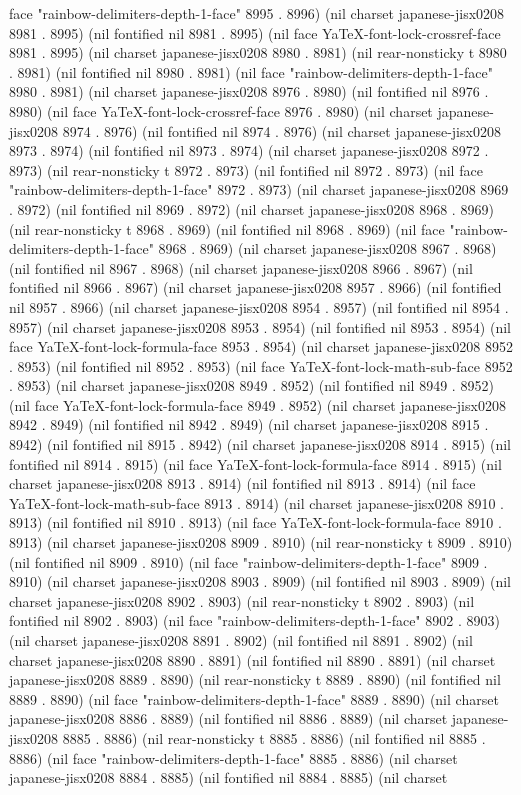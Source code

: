 face "rainbow-delimiters-depth-1-face" 8995 . 8996) (nil charset japanese-jisx0208 8981 . 8995) (nil fontified nil 8981 . 8995) (nil face YaTeX-font-lock-crossref-face 8981 . 8995) (nil charset japanese-jisx0208 8980 . 8981) (nil rear-nonsticky t 8980 . 8981) (nil fontified nil 8980 . 8981) (nil face "rainbow-delimiters-depth-1-face" 8980 . 8981) (nil charset japanese-jisx0208 8976 . 8980) (nil fontified nil 8976 . 8980) (nil face YaTeX-font-lock-crossref-face 8976 . 8980) (nil charset japanese-jisx0208 8974 . 8976) (nil fontified nil 8974 . 8976) (nil charset japanese-jisx0208 8973 . 8974) (nil fontified nil 8973 . 8974) (nil charset japanese-jisx0208 8972 . 8973) (nil rear-nonsticky t 8972 . 8973) (nil fontified nil 8972 . 8973) (nil face "rainbow-delimiters-depth-1-face" 8972 . 8973) (nil charset japanese-jisx0208 8969 . 8972) (nil fontified nil 8969 . 8972) (nil charset japanese-jisx0208 8968 . 8969) (nil rear-nonsticky t 8968 . 8969) (nil fontified nil 8968 . 8969) (nil face "rainbow-delimiters-depth-1-face" 8968 . 8969) (nil charset japanese-jisx0208 8967 . 8968) (nil fontified nil 8967 . 8968) (nil charset japanese-jisx0208 8966 . 8967) (nil fontified nil 8966 . 8967) (nil charset japanese-jisx0208 8957 . 8966) (nil fontified nil 8957 . 8966) (nil charset japanese-jisx0208 8954 . 8957) (nil fontified nil 8954 . 8957) (nil charset japanese-jisx0208 8953 . 8954) (nil fontified nil 8953 . 8954) (nil face YaTeX-font-lock-formula-face 8953 . 8954) (nil charset japanese-jisx0208 8952 . 8953) (nil fontified nil 8952 . 8953) (nil face YaTeX-font-lock-math-sub-face 8952 . 8953) (nil charset japanese-jisx0208 8949 . 8952) (nil fontified nil 8949 . 8952) (nil face YaTeX-font-lock-formula-face 8949 . 8952) (nil charset japanese-jisx0208 8942 . 8949) (nil fontified nil 8942 . 8949) (nil charset japanese-jisx0208 8915 . 8942) (nil fontified nil 8915 . 8942) (nil charset japanese-jisx0208 8914 . 8915) (nil fontified nil 8914 . 8915) (nil face YaTeX-font-lock-formula-face 8914 . 8915) (nil charset japanese-jisx0208 8913 . 8914) (nil fontified nil 8913 . 8914) (nil face YaTeX-font-lock-math-sub-face 8913 . 8914) (nil charset japanese-jisx0208 8910 . 8913) (nil fontified nil 8910 . 8913) (nil face YaTeX-font-lock-formula-face 8910 . 8913) (nil charset japanese-jisx0208 8909 . 8910) (nil rear-nonsticky t 8909 . 8910) (nil fontified nil 8909 . 8910) (nil face "rainbow-delimiters-depth-1-face" 8909 . 8910) (nil charset japanese-jisx0208 8903 . 8909) (nil fontified nil 8903 . 8909) (nil charset japanese-jisx0208 8902 . 8903) (nil rear-nonsticky t 8902 . 8903) (nil fontified nil 8902 . 8903) (nil face "rainbow-delimiters-depth-1-face" 8902 . 8903) (nil charset japanese-jisx0208 8891 . 8902) (nil fontified nil 8891 . 8902) (nil charset japanese-jisx0208 8890 . 8891) (nil fontified nil 8890 . 8891) (nil charset japanese-jisx0208 8889 . 8890) (nil rear-nonsticky t 8889 . 8890) (nil fontified nil 8889 . 8890) (nil face "rainbow-delimiters-depth-1-face" 8889 . 8890) (nil charset japanese-jisx0208 8886 . 8889) (nil fontified nil 8886 . 8889) (nil charset japanese-jisx0208 8885 . 8886) (nil rear-nonsticky t 8885 . 8886) (nil fontified nil 8885 . 8886) (nil face "rainbow-delimiters-depth-1-face" 8885 . 8886) (nil charset japanese-jisx0208 8884 . 8885) (nil fontified nil 8884 . 8885) (nil charset 